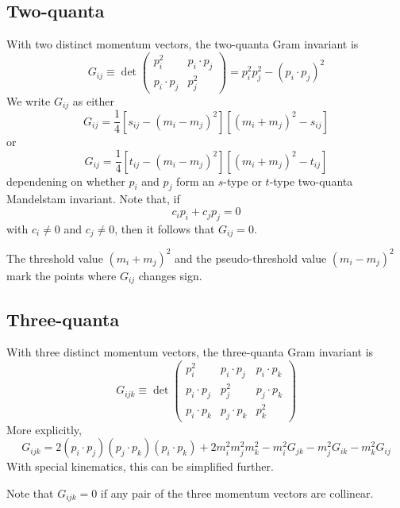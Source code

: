 \subsection{Two-quanta}
With two distinct momentum vectors, the two-quanta Gram invariant is
\begin{equation}
	G_{ij} \equiv \det{ \begin{pmatrix}
	p_{i}^{2} & p_{i} \cdot p_{j} \\
	p_{i} \cdot p_{j} & p_{j}^{2}
\end{pmatrix} } = p_{i}^{2} p_{j}^{2} - (p_{i} \cdot p_{j})^{2}
\end{equation}
We write $G_{ij}$ as either
\begin{equation}
	G_{ij} = \frac{1}{4} [s_{ij} - (m_{i} - m_{j})^{2}] [(m_{i} + m_{j})^{2} - s_{ij}]
\end{equation}
or
\begin{equation}
	G_{ij} = \frac{1}{4} [t_{ij} - (m_{i} - m_{j})^{2}] [(m_{i} + m_{j})^{2} - t_{ij}]
\end{equation}
dependening on whether $p_{i}$ and $p_{j}$ form an $s$-type or $t$-type two-quanta Mandelstam invariant. Note that, if
\begin{equation}
	c_{i} p_{i} + c_{j} p_{j} = 0
\end{equation}
with $c_{i} \neq 0$ and $c_{j} \neq 0$, then it follows that $G_{ij} = 0$.

The threshold value $(m_{i} + m_{j})^{2}$ and the pseudo-threshold value $(m_{i} - m_{j})^{2}$ mark the points where $G_{ij}$ changes sign.
\subsection{Three-quanta}
With three distinct momentum vectors, the three-quanta Gram invariant is
\begin{equation}
	G_{ijk} \equiv \det{ \begin{pmatrix}
	p_{i}^{2} & p_{i} \cdot p_{j} & p_{i} \cdot p_{k} \\
	p_{i} \cdot p_{j} & p_{j}^{2} & p_{j} \cdot p_{k} \\
	p_{i} \cdot p_{k} & p_{j} \cdot p_{k} & p_{k}^{2}
\end{pmatrix}}
\end{equation}
More explicitly,
\begin{equation}
	G_{ijk} = 2(p_{i} \cdot p_{j})(p_{j} \cdot p_{k})(p_{i} \cdot p_{k}) + 2m_{i}^{2} m_{j}^{2} m_{k}^{2} - m_{i}^{2} G_{jk} - m_{j}^{2} G_{ik} - m_{k}^{2} G_{ij}
\end{equation}
With special kinematics, this can be simplified further.

Note that $G_{ijk} = 0$ if any pair of the three momentum vectors are collinear.